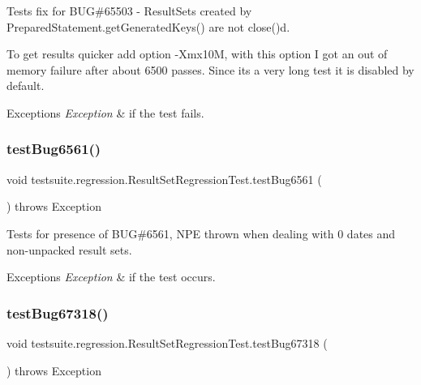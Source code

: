 Tests fix for B\+UG\#65503 -\/ Result\+Sets created by Prepared\+Statement.\+get\+Generated\+Keys() are not close()d.

To get results quicker add option -\/\+Xmx10M, with this option I got an out of memory failure after about 6500 passes. Since it\textquotesingle{}s a very long test it is disabled by default.


\begin{DoxyExceptions}{Exceptions}
{\em Exception} & if the test fails. \\
\hline
\end{DoxyExceptions}
\mbox{\label{classtestsuite_1_1regression_1_1_result_set_regression_test_acd7be9d4220a08025d79f53a76395993}} 
\subsubsection{\texorpdfstring{test\+Bug6561()}{testBug6561()}}
{\footnotesize\ttfamily void testsuite.\+regression.\+Result\+Set\+Regression\+Test.\+test\+Bug6561 (\begin{DoxyParamCaption}{ }\end{DoxyParamCaption}) throws Exception}

Tests for presence of B\+UG\#6561, N\+PE thrown when dealing with 0 dates and non-\/unpacked result sets.


\begin{DoxyExceptions}{Exceptions}
{\em Exception} & if the test occurs. \\
\hline
\end{DoxyExceptions}
\mbox{\label{classtestsuite_1_1regression_1_1_result_set_regression_test_a1ef1850491041aac8a3c98968d839a10}} 
\subsubsection{\texorpdfstring{test\+Bug67318()}{testBug67318()}}
{\footnotesize\ttfamily void testsuite.\+regression.\+Result\+Set\+Regression\+Test.\+test\+Bug67318 (\begin{DoxyParamCaption}{ }\end{DoxyParamCaption}) throws Exception}

